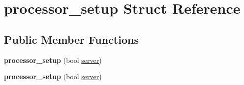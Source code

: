 \hypertarget{structprocessor__setup}{}\section{processor\+\_\+setup Struct Reference}
\label{structprocessor__setup}
\subsection*{Public Member Functions}
\begin{DoxyCompactItemize}
\item 
{\bfseries processor\+\_\+setup} (bool \hyperlink{classwebsocketpp_1_1server}{server})\hypertarget{structprocessor__setup_a760f623a2b8349aa21b8dd565b29e593}{}\label{structprocessor__setup_a760f623a2b8349aa21b8dd565b29e593}

\item 
{\bfseries processor\+\_\+setup} (bool \hyperlink{classwebsocketpp_1_1server}{server})\hypertarget{structprocessor__setup_a760f623a2b8349aa21b8dd565b29e593}{}\label{structprocessor__setup_a760f623a2b8349aa21b8dd565b29e593}

\end{DoxyCompactItemize}
